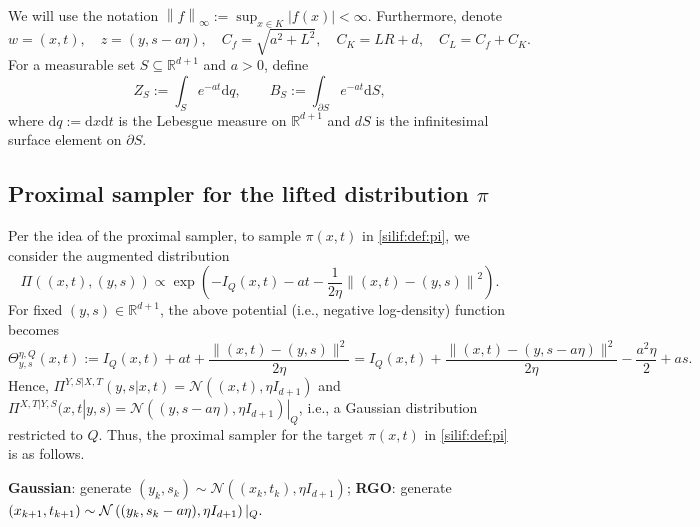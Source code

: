 \documentclass[11pt,letterpaper]{article}
\newcommand{\R}{\mathbb{R}}
\newcommand{\norm}[1]{\left\lVert #1 \right\rVert}
\newcommand{\D}{\mathrm{d}}
\newcommand{\brac}[1]{\left( #1\right)}
\begin{document}
We will use the notation $\norm{f}_\infty:=\sup_{x\in K}|f(x)|<\infty$. Furthermore, denote
\begin{equation}\label{silif:def:notation}
    w=(x,t), \quad z=(y,s-a\eta), \quad C_f=\sqrt{a^2+L^2}, \quad C_K=LR+d, \quad C_L=C_f+C_K.
\end{equation}
 For a measurable set  $S\subseteq \R^{d+1}$ and $a>0$, define
\begin{equation}
\label{def:ZandB}
Z_{S}:=\int_{S} e^{-a t} \D q,
\qquad
B_{S}:=\int_{\partial S} e^{-a t} \D S,
\end{equation}
where $\D q:=\D x \D t$ is the Lebesgue measure on $\R^{d+1}$ and $dS$ is the infinitesimal surface element on $\partial S$.

\subsection{Proximal sampler for the lifted distribution $\pi$}
\label{silif:sec:asf}
Per the idea of the proximal sampler, to sample $\pi(x,t)$ in \eqref{silif:def:pi}, we consider the augmented distribution
\begin{equation}
\label{silif:def:bigpi}
    \Pi((x,t),(y,s))\propto \exp\left(-I_Q(x,t) - at - \frac{1}{2\eta}\norm{(x,t)-(y,s)}^2 \right).
\end{equation}
For fixed $(y,s)\in \R^{d+1}$, the above potential (i.e., negative log-density) function becomes
\begin{equation}\label{silif:def:Theta}
\Theta^{\eta,Q}_{y,s}(x,t)
:= I_Q(x,t)+at+\frac{\|(x,t)-(y,s)\|^2}{2\eta}
= I_Q(x,t)+\frac{\|(x,t)-(y,s-a\eta)\|^2}{2\eta}-\frac{a^2\eta}{2}+as.
\end{equation} 
Hence, $ \Pi^{Y,S|X,T}(y,s|x,t) = \mathcal{N}\brac{(x,t),\eta I_{d+1}}$ and 
$\Pi^{X,T|Y,S}(x,t|y,s) = \mathcal{N}\brac{(y,s-a\eta),\eta I_{d+1}}|_Q$, i.e., a Gaussian distribution restricted to $Q$. 
Thus, the proximal sampler for the target $\pi(x,t)$ in \eqref{silif:def:pi} is as follows.
\begin{algorithm}[H]
	\caption{Proximal sampler for the target $\pi$ in \eqref{silif:def:pi}}
	\label{silif:alg:ASF_pi}
	\begin{algorithmic}[1]
		\State  \textbf{Gaussian}: generate $(y_k,s_k)\sim  \mathcal{N}\brac{(x_k,t_k),\eta I_{d+1}}$;
		\State \textbf{RGO}: generate $(x_{k+1},t_{k+1})\sim {\cal N}\brac{(y_k,s_k-a\eta),\eta I_{d+1}}|_Q. $
	\end{algorithmic}
\end{algorithm}
\end{document}
